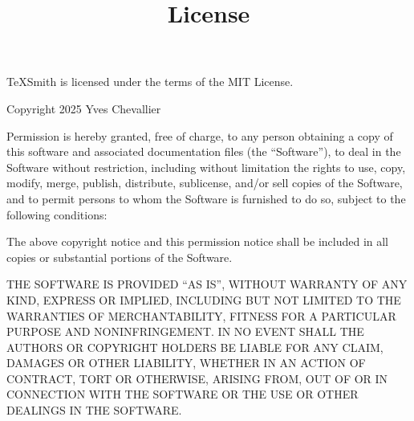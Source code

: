 \documentclass[a4paper,twoside]{article}
\title{License}
\author{}\date{}
\begin{document}
\maketitle
TeXSmith is licensed under the terms of the MIT License.

Copyright  2025 Yves Chevallier

Permission is hereby granted, free of charge, to any person obtaining a copy
of this software and associated documentation files (the \enquote{Software}), to deal
in the Software without restriction, including without limitation the rights
to use, copy, modify, merge, publish, distribute, sublicense, and/or sell
copies of the Software, and to permit persons to whom the Software is
furnished to do so, subject to the following conditions:

The above copyright notice and this permission notice shall be included in all
copies or substantial portions of the Software.

THE SOFTWARE IS PROVIDED \enquote{AS IS}, WITHOUT WARRANTY OF ANY KIND, EXPRESS OR
IMPLIED, INCLUDING BUT NOT LIMITED TO THE WARRANTIES OF MERCHANTABILITY,
FITNESS FOR A PARTICULAR PURPOSE AND NONINFRINGEMENT. IN NO EVENT SHALL THE
AUTHORS OR COPYRIGHT HOLDERS BE LIABLE FOR ANY CLAIM, DAMAGES OR OTHER
LIABILITY, WHETHER IN AN ACTION OF CONTRACT, TORT OR OTHERWISE, ARISING FROM,
OUT OF OR IN CONNECTION WITH THE SOFTWARE OR THE USE OR OTHER DEALINGS IN THE
SOFTWARE.
\end{document}
